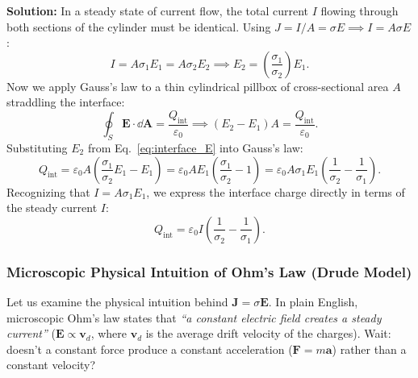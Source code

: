 \begin{example}
\textbf{Solution:}
In a steady state of current flow, the total current $I$ flowing through both sections of the cylinder must be identical. Using $J = I/A = \sigma E \implies I = A \sigma E$:
\begin{equation}
    I = A \sigma_1 E_1 = A \sigma_2 E_2 \implies E_2 = \left( \frac{\sigma_1}{\sigma_2} \right) E_1. \label{eq:interface_E}
\end{equation}
Now we apply Gauss's law to a thin cylindrical pillbox of cross-sectional area $A$ straddling the interface:
\begin{equation*}
    \oint_S \bm{E} \cdot \dd{\bm{A}} = \frac{Q_{\text{int}}}{\varepsilon_0} \implies (E_2 - E_1) A = \frac{Q_{\text{int}}}{\varepsilon_0}.
\end{equation*}
Substituting $E_2$ from Eq.~\eqref{eq:interface_E} into Gauss's law:
\begin{equation*}
    Q_{\text{int}} = \varepsilon_0 A \left( \frac{\sigma_1}{\sigma_2} E_1 - E_1 \right) = \varepsilon_0 A E_1 \left( \frac{\sigma_1}{\sigma_2} - 1 \right) = \varepsilon_0 A \sigma_1 E_1 \left( \frac{1}{\sigma_2} - \frac{1}{\sigma_1} \right).
\end{equation*}
Recognizing that $I = A \sigma_1 E_1$, we express the interface charge directly in terms of the steady current $I$:
\begin{equation}
    Q_{\text{int}} = \varepsilon_0 I \left( \frac{1}{\sigma_2} - \frac{1}{\sigma_1} \right).
\end{equation}
\end{example}

\subsubsection{Microscopic Physical Intuition of Ohm's Law (Drude Model)}

Let us examine the physical intuition behind $\bm{J} = \sigma \bm{E}$. In plain English, microscopic Ohm's law states that \emph{``a constant electric field creates a steady current''} ($\bm{E} \propto \bm{v}_d$, where $\bm{v}_d$ is the average drift velocity of the charges). Wait: doesn't a constant force produce a constant acceleration ($\bm{F} = m\bm{a}$) rather than a constant velocity?


